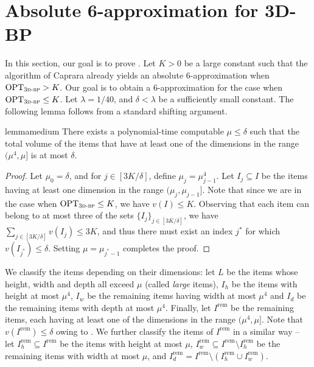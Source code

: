 \documentclass[a4paper,UKenglish,cleveref, autoref, thm-restate]{lipics-v2021}
\newcommand{\opt}{\mathrm{OPT}}
\newcommand{\tbp}{\textsc{3d-bp}\xspace}
\begin{document}
\section{Absolute 6-approximation for 3D-BP}
\label{sec:absolutesix}
In this section, our goal is to prove . Let $K>0$ be a large constant such that the algorithm of Caprara \cite{caprara2008packing} already yields an absolute 6-approximation when $\opt_{\tbp}>K$. Our goal is to obtain a 6-approximation for the case when $\opt_{\tbp} \le K$. 
Let $\lambda = 1/40$, and $\delta<\lambda$ be a sufficiently small constant. 
The following lemma follows from a standard shifting argument. 


\begin{restatable}{lemma}{medium}
\label{lem:medium}
    There exists a polynomial-time computable $\mu \le \delta$ such that the total volume of the items that have at least one of the dimensions in the range $(\mu^4,\mu]$ is at most $\delta$.
\end{restatable}

\begin{proof}
    Let $\mu_0 = \delta$, and for $j\in [3K/\delta]$, define $\mu_j = \mu_{j-1}^4$. Let $I_j \subseteq I$ be the items having at least one dimension in the range $(\mu_j, \mu_{j-1}]$. Note that since we are in the case when $\opt_{\tbp}\le K$, we have $v(I)\le K$. Observing that each item can belong to at most three of the sets $\{I_j\}_{j\in [3K/\delta]}$, we have $\sum_{j\in [3K/\delta]} v(I_j) \le 3K$, and thus there must exist an index $j^*$ for which $v(I_{j^*}) \le \delta$. Setting $\mu = \mu_{j^*-1}$ completes the proof.
\end{proof}

We classify the items depending on their dimensions: let $L$ be the items whose height, width and depth all exceed $\mu$ (called \emph{large} items), $I_h$ be the items with height at most $\mu^4$, $I_w$ be the remaining items having width at most $\mu^4$ and $I_d$ be the remaining items with depth at most $\mu^4$. Finally, let $I^{\text{rem}}$ be the remaining items, each having at least one of the dimensions in the range $(\mu^4,\mu]$. Note that $v(I^{\text{rem}})\le \delta$ owing to . We further classify the items of $I^{\text{rem}}$ in a similar way -- let $I^{\text{rem}}_h \subseteq I^{\text{rem}}$ be the items with height at most $\mu$, $I^{\text{rem}}_w \subseteq I^{\text{rem}}\setminus I^{\text{rem}}_h$ be the remaining items with width at most $\mu$, and $I^{\text{rem}}_d = I^{\text{rem}} \setminus (I^{\text{rem}}_h \cup I^{\text{rem}}_w)$.
\end{document}

